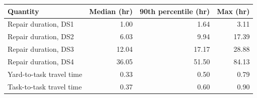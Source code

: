 ﻿\begin{tabular}{lrrr}
\toprule
Quantity & Median (hr) & 90th percentile (hr) & Max (hr) \\
\midrule
Repair duration, DS1 & 1.00 & 1.64 & 3.11 \\
Repair duration, DS2 & 6.03 & 9.94 & 17.39 \\
Repair duration, DS3 & 12.04 & 17.17 & 28.88 \\
Repair duration, DS4 & 36.05 & 51.50 & 84.13 \\
Yard-to-task travel time & 0.33 & 0.50 & 0.79 \\
Task-to-task travel time & 0.37 & 0.60 & 0.90 \\
\bottomrule
\end{tabular}
